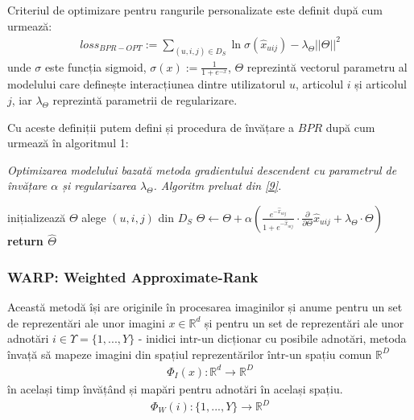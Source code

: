 Criteriul de optimizare pentru rangurile personalizate este definit după cum urmează:
\begin{align}
	loss_{BPR-OPT} := \sum_{(u,i,j) \in D_S} \ln{\sigma(\hat{x}_{uij})} - \lambda_\Theta||\Theta||^2
\end{align}
unde $\sigma$ este funcția sigmoid, $\sigma(x) := \frac{1}{1+e^{-x}}$, $\Theta$ reprezintă vectorul parametru al modelului care definește interacțiunea dintre utilizatorul $u$, articolul $i$ și articolul $j$, iar $\lambda_\Theta$ reprezintă parametrii de regularizare.

Cu aceste definiții putem defini și procedura de învățare a $BPR$ după cum urmează în algoritmul 1:
\begin{algorithm}[!h]
\caption[Procedura de învățarea BPR]{\textit{Optimizarea modelului bazată metoda gradientului descendent cu parametrul de învățare $\alpha$ și regularizarea $\lambda_\Theta$. Algoritm preluat din \hyperlink{SteffenRendleChristophFreudenthalerZenoGantnerLarsSchmidtThieme}{[9]}.}}
\begin{algorithmic}[!h]
    \State inițializează $\Theta$ 
    \Repeat
    \State alege $(u,i,j)$ din $D_S$
    \State $\Theta \leftarrow \Theta + \alpha(\frac{e^{-\hat{x}_{uij}}}{1+e^{-\hat{x}_{uij}}} \cdot \frac{\partial}{\partial\Theta}\hat{x}_{uij} + \lambda_\Theta \cdot \Theta)$
    \State \textbf{return $\hat{\Theta}$}
\EndProcedure
\end{algorithmic}
\end{algorithm}

\pagebreak
\subsubsection*{WARP: Weighted Approximate-Rank}
Această metodă își are originile în procesarea imaginilor și anume pentru un set de reprezentări ale unor imagini $x \in \mathbb{R}^d$ și pentru un set de reprezentări ale unor adnotări $i \in \Upsilon = \{1, ..., Y\}$ - inidici intr-un dicționar cu posibile adnotări, metoda învață să mapeze imagini din spațiul reprezentărilor într-un spațiu comun $\mathbb{R}^D$
\begin{align}
	\Phi_{I}(x):\mathbb{R}^d \rightarrow \mathbb{R}^D
\end{align}
în același timp învățând și mapări pentru adnotări în același spațiu.
\begin{align}
	\Phi_{W}(i):\{1,...,Y\} \rightarrow \mathbb{R}^D
\end{align}


